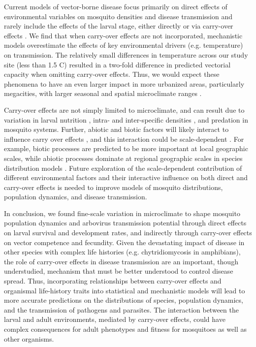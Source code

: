 \documentclass[12pt]{article}
\begin{document}
Current models of vector-borne disease focus primarily on direct effects of environmental variables on mosquito densities and disease transmission and rarely include the effects of the larval stage, either directly or via carry-over effects \citep{reiner2013}. We find that when carry-over effects are not incorporated, mechanistic models overestimate the effects of key environmental drivers (e.g. temperature) on transmission. The relatively small differences in temperature across our study site (less than 1.5 \degree C) resulted in a two-fold difference in predicted vectorial capacity when omitting carry-over effects. Thus, we would expect these phenomena to have an even larger impact in more urbanized areas, particularly megacities, with larger seasonal and spatial microclimate ranges \citep{peng2012}.

Carry-over effects are not simply limited to microclimate, and can result due to variation in larval nutrition \citep{moller-jacobs2014}, intra- and inter-specific densities \citep{alto2005}, and predation \citep{roux2015a} in mosquito systems. Further, abiotic and biotic factors will likely interact to influence carry over effects \citep{buckner2016, muturi2012a}, and this interaction could be scale-dependent \citep{leisnham2014}. For example, biotic processes are predicted to be more important at local geographic scales, while abiotic processes dominate at regional geographic scales in species distribution models \citep{cohen2016}. Future exploration of the scale-dependent contribution of different environmental factors and their interactive influence on both direct and carry-over effects is needed to improve models of mosquito distributions, population dynamics, and disease transmission.

In conclusion, we found fine-scale variation in microclimate to shape mosquito population dynamics and arbovirus transmission potential through direct effects on larval survival and development rates, and indirectly through carry-over effects on vector competence and fecundity. Given the devastating impact of disease in other species with complex life histories (e.g. chytridiomycosis in amphibians), the role of carry-over effects in disease transmission are an important, though understudied, mechanism that must be better understood to control disease spread. Thus, incorporating relationships between carry-over effects and organismal life-history traits into statistical and mechanistic models will lead to more accurate predictions on the distributions of species, population dynamics, and the transmission of pathogens and parasites. The interaction between the larval and adult environments, mediated by carry-over effects, could have complex consequences for adult phenotypes and fitness for mosquitoes as well as other organisms.
\end{document}
